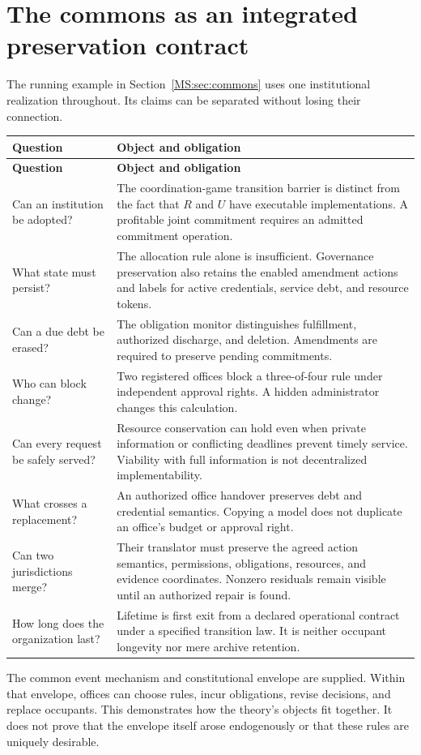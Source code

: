 \documentclass[11pt,oneside,openany]{book}
\numberwithin{equation}{section}
\begin{document}
\section{The commons as an integrated preservation contract}\label{MS:app:allocation}
The running example in Section~\ref{MS:sec:commons} uses one institutional realization throughout. Its claims can be separated without losing their connection.
\begin{longtable}{@{}P{.25\linewidth}P{.69\linewidth}@{}}
\toprule
\textbf{Question} & \textbf{Object and obligation}\\\midrule
\endfirsthead
\toprule\textbf{Question}&\textbf{Object and obligation}\\\midrule\endhead
Can an institution be adopted? & The coordination-game transition barrier is distinct from the fact that $R$ and $U$ have executable implementations. A profitable joint commitment requires an admitted commitment operation.\\[.5em]
What state must persist? & The allocation rule alone is insufficient. Governance preservation also retains the enabled amendment actions and labels for active credentials, service debt, and resource tokens.\\[.5em]
Can a due debt be erased? & The obligation monitor distinguishes fulfillment, authorized discharge, and deletion. Amendments are required to preserve pending commitments.\\[.5em]
Who can block change? & Two registered offices block a three-of-four rule under independent approval rights. A hidden administrator changes this calculation.\\[.5em]
Can every request be safely served? & Resource conservation can hold even when private information or conflicting deadlines prevent timely service. Viability with full information is not decentralized implementability.\\[.5em]
What crosses a replacement? & An authorized office handover preserves debt and credential semantics. Copying a model does not duplicate an office's budget or approval right.\\[.5em]
Can two jurisdictions merge? & Their translator must preserve the agreed action semantics, permissions, obligations, resources, and evidence coordinates. Nonzero residuals remain visible until an authorized repair is found.\\[.5em]
How long does the organization last? & Lifetime is first exit from a declared operational contract under a specified transition law. It is neither occupant longevity nor mere archive retention.\\
\bottomrule
\end{longtable}
The common event mechanism and constitutional envelope are supplied. Within that envelope, offices can choose rules, incur obligations, revise decisions, and replace occupants. This demonstrates how the theory's objects fit together. It does not prove that the envelope itself arose endogenously or that these rules are uniquely desirable.
\end{document}
